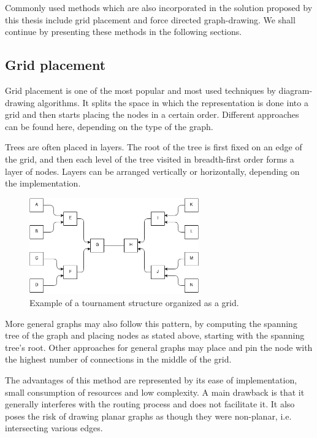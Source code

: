 Commonly used methods which are also incorporated in the solution proposed by this thesis include grid placement and 
force directed graph-drawing. We shall continue by presenting these methods in the following sections.

\subsection{Grid placement}

Grid placement\cite{de1990draw} is one of the most popular and most used techniques by diagram-drawing algorithms. It splits the space in 
which the representation is done into a grid and then starts placing the nodes in a certain order. Different approaches 
can be found here, depending on the type of the graph. 

Trees are often placed in layers. The root of the tree is first fixed on an edge of the grid, and then each level of the tree 
visited in breadth-first order forms a layer of nodes. Layers can be arranged vertically or horizontally, depending on the implementation.

\begin{figure}[ht] \centering
\includegraphics[width=0.65\textwidth]{img/algdesing/grid_example.png}
\caption{Example of a tournament structure organized as a grid.} \end{figure}

More general graphs may also follow this pattern, by computing the spanning tree\cite{graham1985history} of the graph and placing nodes as stated above, 
starting with the spanning tree's root. Other approaches for general graphs may place and pin the node with the highest number of 
connections in the middle of the grid.

The advantages of this method are represented by its ease of implementation, small consumption of resources and low complexity. A main drawback 
is that it generally interferes with the routing process and does not facilitate it. It also poses the risk of drawing planar graphs as though 
they were non-planar, i.e. intersecting various edges.

